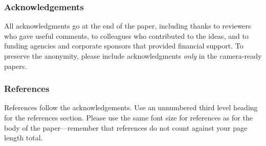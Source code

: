 \documentclass[twoside]{article}
\begin{document}
\subsubsection*{Acknowledgements}
All acknowledgments go at the end of the paper, including thanks to reviewers who gave useful comments, to colleagues who contributed to the ideas, and to funding agencies and corporate sponsors that provided financial support. 
To preserve the anonymity, please include acknowledgments \emph{only} in the camera-ready papers.


\subsubsection*{References}

References follow the acknowledgements.  Use an unnumbered third level
heading for the references section.  Please use the same font
size for references as for the body of the paper---remember that
references do not count against your page length total.


{}

\end{document}
